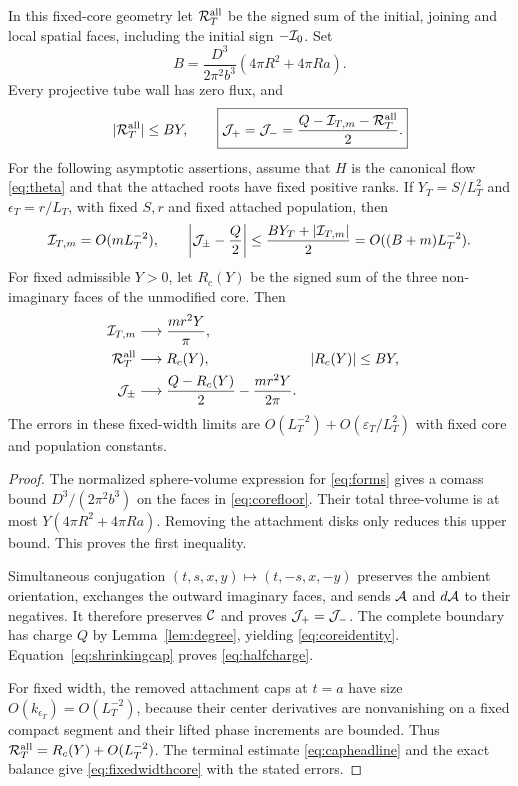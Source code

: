 \begin{theorem}
\label{thm:core}
In this fixed-core geometry let $\mathcal R_T^{\rm all}$ be the
signed sum of the initial, joining and local spatial faces, including
the initial sign $-\mathcal I_0$. Set
\begin{equation}
 B=\frac{D^3}{2\pi^2b^3}(4\pi R^2+4\pi Ra).
 \label{eq:Bcore}
\end{equation}
Every projective tube wall has zero flux, and
\begin{equation}
 |\mathcal R_T^{\rm all}|\le BY,\qquad
 \boxed{\displaystyle
 \mathcal J_+=\mathcal J_-=
 \frac{Q-\mathcal I_{T,m}-\mathcal R_T^{\rm all}}2.}
 \label{eq:coreidentity}
\end{equation}
For the following asymptotic assertions, assume that $H$ is the
canonical flow \eqref{eq:theta} and that the attached roots have
fixed positive ranks. If $Y_T=S/L_T^2$ and $\epsilon_T=r/L_T$, with
fixed $S,r$ and fixed attached population, then
\begin{equation}
 \mathcal I_{T,m}=O(mL_T^{-2}),\qquad
 \left|\mathcal J_\pm-\frac Q2\right|
 \le\frac{BY_T+|\mathcal I_{T,m}|}{2}
 =O((B+m)L_T^{-2}).
 \label{eq:halfcharge}
\end{equation}
For fixed admissible $Y>0$, let $R_c(Y)$ be the signed sum of the
three non-imaginary faces of the unmodified core. Then
\begin{align}
 \mathcal I_{T,m}&\longrightarrow \frac{mr^2Y}{\pi},\nonumber\\
 \mathcal R_T^{\rm all}&\longrightarrow R_c(Y),
       &|R_c(Y)|&\le BY,\nonumber\\
 \mathcal J_\pm&\longrightarrow
      \frac{Q-R_c(Y)}2-\frac{mr^2Y}{2\pi}.
 \label{eq:fixedwidthcore}
\end{align}
The errors in these fixed-width limits are
$O(L_T^{-2})+O(\varepsilon_T/L_T^2)$ with fixed core and
population constants.
\end{theorem}
\begin{proof}
The normalized sphere-volume expression for \eqref{eq:forms}
gives a comass bound $D^3/(2\pi^2b^3)$ on the faces in
\eqref{eq:corefloor}. Their total three-volume is at most
$Y(4\pi R^2+4\pi Ra)$. Removing the attachment disks only
reduces this upper bound. This proves the first inequality.

Simultaneous conjugation $(t,s,x,y)\mapsto(t,-s,x,-y)$ preserves
the ambient orientation, exchanges the outward imaginary faces,
and sends $\mathcal A$ and $d\mathcal A$ to their negatives. It therefore
preserves $\mathcal C$ and proves $\mathcal J_+=\mathcal J_-$. The complete boundary
has charge $Q$ by Lemma~\ref{lem:degree}, yielding
\eqref{eq:coreidentity}. Equation~\eqref{eq:shrinkingcap} proves
\eqref{eq:halfcharge}.

For fixed width, the removed attachment caps at $t=a$ have size
$O(k_{\epsilon_T})=O(L_T^{-2})$, because their center derivatives
are nonvanishing on a fixed compact segment and their lifted phase
increments are bounded. Thus
$\mathcal R_T^{\rm all}=R_c(Y)+O(L_T^{-2})$.
The terminal estimate \eqref{eq:capheadline} and the exact balance
give \eqref{eq:fixedwidthcore} with the stated errors.
\end{proof}

